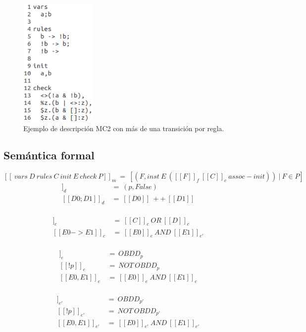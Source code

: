 \begin{figure}[H]
  \centering
  \includegraphics[width=0.33\textwidth]{Figures/modeloMC2-3.png}
  \caption{Ejemplo de descripción MC2 con más de una transición por regla.}
  \label{fig:MC2-3}
\end{figure}

\subsection{Semántica formal}

$[[\ vars\ D\ rules\ C\ init\ E\ check\ P ]]_{m}\ =\ [(F,inst\ E\ ([[F]]_{f}\ [[C]]_{c}\ assoc-init))\ |\ F \in P]$ \\

\begin{align*}
[[p]]_{d}\ &=\ (p,False) \\
[[D0;D1]]_{d}\ &=\ [[D0]]\ ++\ [[D1]] \\
\end{align*}

\begin{align*}
[[C;D]]_{c}\ &=\ [[C]]_{c}\ OR\ [[D]]_{c} \\
[[E0->E1]]_{c}\ &=\ [[E0]]_{e}\ AND\ [[E1]]_{e'} \\
\end{align*}

\begin{align*}
[[p]]_{e}\ &=\ OBDD_{p} \\
[[!p]]_{e}\ &=\ NOT\ OBDD_{p} \\
[[E0,E1]]_{e}\ &=\ [[E0]]_{e}\ AND\ [[E1]]_{e} \\
\end{align*}

\begin{align*}
[[p]]_{e'}\ &=\ OBDD_{p'} \\
[[!p]]_{e'}\ &=\ NOT\ OBDD_{p'} \\
[[E0,E1]]_{e'}\ &=\ [[E0]]_{e'}\ AND\ [[E1]]_{e'} \\
\end{align*}

